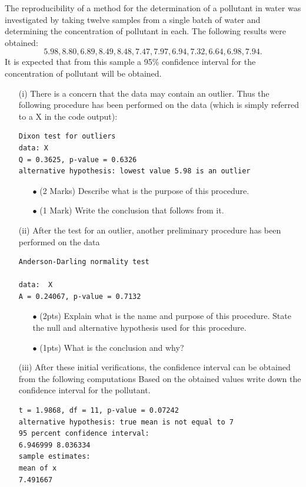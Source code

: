 \documentclass[a4paper,12pt]{article}
\begin{document}
The reproducibility of a method for the determination of a pollutant in water was investigated by
taking twelve samples from a single batch of water and determining the concentration of pollutant
in each. The following results were obtained:\[ 5.98, 8.80, 6.89, 8.49, 8.48, 7.47, 7.97, 6.94, 7.32, 6.64,
6.98, 7.94. \]
It is expected that from this sample a 95\% confidence interval for the concentration of
pollutant will be obtained.
\begin{itemize}
\item[(i)] There is a concern that the data may contain an outlier. Thus the following procedure has been
performed on the data (which is simply referred to a X in the code output):
\begin{framed}
\begin{verbatim}
Dixon test for outliers
data: X
Q = 0.3625, p-value = 0.6326
alternative hypothesis: lowest value 5.98 is an outlier
\end{verbatim}
\end{framed}
\begin{itemize}
\item[$\bullet$] (2 Marks) Describe what is the purpose of this procedure.
\item[$\bullet$] (1 Mark) Write the conclusion that follows from it.
\end{itemize}

\item[(ii)] After the test for an outlier, another preliminary procedure has been performed on the data
\begin{framed}
	\begin{verbatim}
Anderson-Darling normality test

data:  X
A = 0.24067, p-value = 0.7132
\end{verbatim}
\end{framed}
\begin{itemize}
	\item[$\bullet$] (2pts) Explain what is the name and purpose of this procedure. State the null and alternative hypothesis used for this procedure.
\item[$\bullet$] (1pts) What is the conclusion and why?
\end{itemize}
\newpage
\item[(iii)] After these initial verifications, the confidence interval can be obtained from the following computations
Based on the obtained values write down the confidence interval for the pollutant. 
\begin{framed}
\begin{verbatim}
t = 1.9868, df = 11, p-value = 0.07242
alternative hypothesis: true mean is not equal to 7
95 percent confidence interval:
6.946999 8.036334
sample estimates:
mean of x 
7.491667 
\end{verbatim}
\end{framed}
\end{itemize}
\newpage
\end{document}
